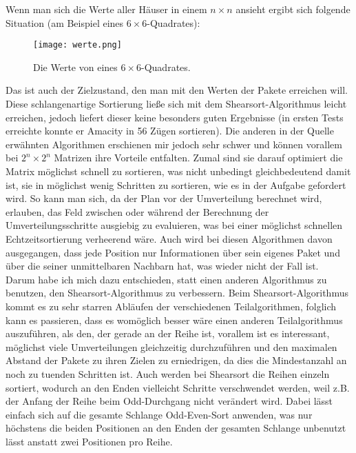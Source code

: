 \documentclass[12pt]{article}
\begin{document}
Wenn man sich die Werte aller Häuser in einem $n\times n$ ansieht ergibt sich folgende Situation (am Beispiel eines $6\times6$-Quadrates):\\
\begin{figure}[h]
\centering
\texttt{[image: werte.png]}
\caption{Die Werte von eines $6\times6$-Quadrates.}
\end{figure}
Das ist auch der Zielzustand, den man mit den Werten der Pakete erreichen will. Diese schlangenartige Sortierung ließe sich mit dem Shearsort-Algorithmus\cite{3} leicht erreichen, jedoch liefert dieser keine besonders guten Ergebnisse (in ersten Tests erreichte konnte er Amacity in 56 Zügen sortieren). Die anderen in der Quelle erwähnten Algorithmen erschienen mir jedoch sehr schwer und können vorallem bei $2^n\times 2^n$ Matrizen ihre Vorteile entfalten. Zumal sind sie darauf optimiert die Matrix möglichst schnell zu sortieren, was nicht unbedingt gleichbedeutend damit ist, sie in möglichst wenig Schritten zu sortieren, wie es in der Aufgabe gefordert wird. So kann man sich, da der Plan vor der Umverteilung berechnet wird, erlauben, das Feld zwischen oder während der Berechnung der Umverteilungsschritte ausgiebig zu evaluieren, was bei einer möglichst schnellen Echtzeitsortierung verheerend wäre. Auch wird bei diesen Algorithmen davon ausgegangen, dass jede Position nur Informationen über sein eigenes Paket und über die seiner unmittelbaren Nachbarn hat, was wieder nicht der Fall ist.\\

Darum habe ich mich dazu entschieden, statt einen anderen Algorithmus zu benutzen, den Shearsort-Algorithmus zu verbessern. Beim Shearsort-Algorithmus kommt es zu sehr starren Abläufen der verschiedenen Teilalgorithmen, folglich kann es passieren, dass es womöglich besser wäre einen anderen Teilalgorithmus auszuführen, als den, der gerade an der Reihe ist, vorallem ist es interessant, möglichst viele Umverteilungen gleichzeitig durchzuführen und den maximalen Abstand der Pakete zu ihren Zielen zu erniedrigen, da dies die Mindestanzahl an noch zu tuenden Schritten ist. Auch werden bei Shearsort die Reihen einzeln sortiert, wodurch an den Enden vielleicht Schritte verschwendet werden, weil z.B. der Anfang der Reihe beim Odd-Durchgang nicht verändert wird. Dabei lässt einfach sich auf die gesamte Schlange Odd-Even-Sort anwenden, was nur höchstens die beiden Positionen an den Enden der gesamten Schlange unbenutzt lässt anstatt zwei Positionen pro Reihe. \\
\end{document}
